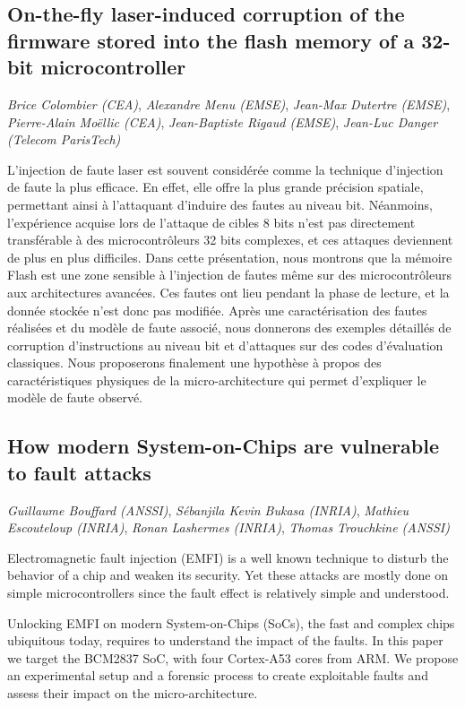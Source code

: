 \documentclass[a4paper,11pt]{article}
\begin{document}
\subsection{On-the-fly laser-induced corruption of the firmware stored into the flash memory of a 32-bit microcontroller}
\label{sec:orgcc68781}
\emph{Brice Colombier (CEA)}, \emph{Alexandre Menu (EMSE)}, \emph{Jean-Max Dutertre (EMSE)}, \emph{Pierre-Alain Moëllic (CEA)}, \emph{Jean-Baptiste Rigaud (EMSE)}, \emph{Jean-Luc Danger (Telecom ParisTech)}

 L'injection de faute laser est souvent considérée comme la
technique d'injection de faute la plus efficace. En effet, elle offre
la plus grande précision spatiale, permettant ainsi à l'attaquant
d'induire des fautes au niveau bit. Néanmoins, l'expérience acquise
lors de l'attaque de cibles 8 bits n'est pas directement transférable
à des microcontrôleurs 32 bits complexes, et ces attaques deviennent
de plus en plus difficiles. Dans cette présentation, nous montrons que
la mémoire Flash est une zone sensible à l'injection de fautes même
sur des microcontrôleurs aux architectures avancées. Ces fautes ont
lieu pendant la phase de lecture, et la donnée stockée n'est donc pas
modifiée. Après une caractérisation des fautes réalisées et du modèle
de faute associé, nous donnerons des exemples détaillés de corruption
d'instructions au niveau bit et d'attaques sur des codes d'évaluation
classiques. Nous proposerons finalement une hypothèse à propos des
caractéristiques physiques de la micro-architecture qui permet
d'expliquer le modèle de faute observé.

\subsection{How modern System-on-Chips are vulnerable to fault attacks}
\label{sec:org63182f3}
\emph{Guillaume Bouffard (ANSSI)}, \emph{Sébanjila Kevin Bukasa (INRIA)},
\emph{Mathieu Escouteloup (INRIA)}, \emph{Ronan Lashermes (INRIA)}, \emph{Thomas
Trouchkine (ANSSI)}

Electromagnetic fault injection (EMFI) is a well known technique to disturb the behavior of a chip and
weaken its security. Yet these attacks are mostly done on simple
microcontrollers since the fault effect is relatively simple and understood.

Unlocking EMFI on modern System-on-Chips (SoCs), the fast and complex chips
ubiquitous today, requires to understand the impact of the faults. In this
paper we target the BCM2837 SoC, with four Cortex-A53 cores from ARM. We
propose an experimental setup and a forensic process to create exploitable
faults and assess their impact on the micro-architecture.
\end{document}
